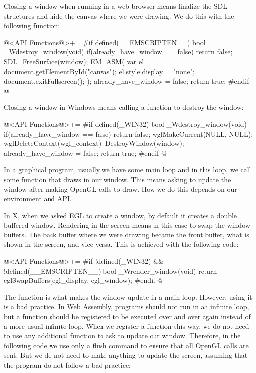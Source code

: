 
Closing a window when running in a web browser means finalize the SDL
structures and hide the canvas where we were drawing. We do this with
the following function:

\iniciocodigo
@<API Functions@>+=
#if defined(__EMSCRIPTEN__)
bool _Wdestroy_window(void){
  if(already_have_window == false)
    return false;
  SDL_FreeSurface(window);
  EM_ASM(
    var el = document.getElementById("canvas");
    el.style.display = "none";
    document.exitFullscreen();
  );
  already_have_window = false;
  return true;
}
#endif
@
\fimcodigo


Closing a window in Windows means calling a function to destroy the
window:

\iniciocodigo
@<API Functions@>+=
#if defined(_WIN32)
bool _Wdestroy_window(void){
  if(already_have_window == false)
    return false;
  wglMakeCurrent(NULL, NULL);
  wglDeleteContext(wgl_context);
  DestroyWindow(window);
  already_have_window = false;
  return true;
}
#endif
@
\fimcodigo


In a graphical program, usually we have some main loop and in this
loop, we call some function that draws in our window. This means
asking to update the window after making OpenGL calls to draw. How we
do this depends on our environment and API.


In X, when we asked EGL to create a window, by default it creates a
double buffered window. Rendering in the screen means in this case to
swap the window buffers. The back buffer where we were drawing became
the front buffer, what is shown in the screen, and vice-versa. This is
achieved with the following code:

\iniciocodigo
@<API Functions@>+=
#if !defined(_WIN32) && !defined(__EMSCRIPTEN__)
bool _Wrender_window(void){
  return eglSwapBuffers(egl_display, egl_window);
}
#endif
@
\fimcodigo


The function  is what makes the window
update in a main loop. However, using it is a bad practice. In Web
Assembly, programs should not run in an infinite loop, but a function
should be registered to be executed over and over again instead of a
more usual infinite loop. When we register a function this way, we do
not need to use any additional function to ask to update our
window. Therefore, in the following code we use only a flush command
to ensure that all OpenGL calls are sent. But we do not need to make
anything to update the screen, assuming that the program do not follow
a bad practice:


